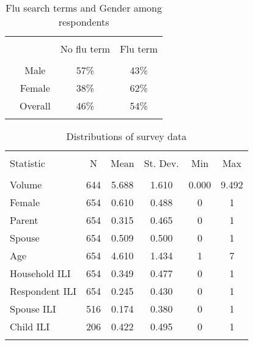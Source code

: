 \documentclass[12pt]{article}
\begin{document}
\begin{table}[!htbp] \centering 
  \caption{Flu search terms and Gender among respondents} 
  \label{descript2b} 
\begin{tabular}{@{\extracolsep{5pt}} lccc} 
\\[-1.8ex]\hline 
\hline \\[-1.8ex] 
 &  & No flu term & Flu term \\ 
\hline \\[-1.8ex] 
 & Male      & 57\% & 43\% \\ 
 & Female    & 38\% & 62\% \\ 
 & Overall   & 46\% & 54\% \\ 
\hline \\[-1.8ex] 
\end{tabular} 
\end{table} 

\begin{table}[!htbp] \centering 
  \caption{Distributions of survey data} 
  \label{tab: Descriptives} 
\begin{tabular}{@{\extracolsep{5pt}}lccccc} 
\\[-1.8ex]\hline 
\hline \\[-1.8ex] 
Statistic & \multicolumn{1}{c}{N} & \multicolumn{1}{c}{Mean} & \multicolumn{1}{c}{St. Dev.} & \multicolumn{1}{c}{Min} & \multicolumn{1}{c}{Max} \\ 
\hline \\[-1.8ex] 
Volume & 644 & 5.688 & 1.610 & 0.000 & 9.492 \\ 
Female & 654 & 0.610 & 0.488 & 0 & 1 \\ 
Parent & 654 & 0.315 & 0.465 & 0 & 1 \\ 
Spouse & 654 & 0.509 & 0.500 & 0 & 1 \\ 
Age & 654 & 4.610 & 1.434 & 1 & 7 \\ 
Household ILI & 654 & 0.349 & 0.477 & 0 & 1 \\ 
Respondent ILI & 654 & 0.245 & 0.430 & 0 & 1 \\ 
Spouse ILI & 516 & 0.174 & 0.380 & 0 & 1 \\ 
Child ILI & 206 & 0.422 & 0.495 & 0 & 1 \\ 
\hline \\[-1.8ex] 
\end{tabular} 
\end{table} 
\end{document}
